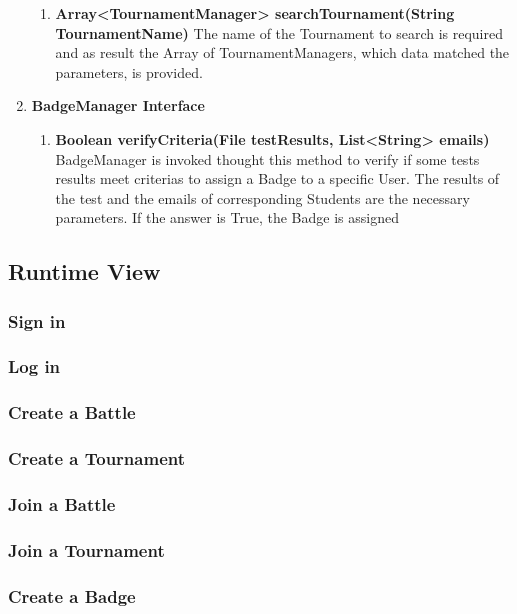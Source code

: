 \begin{enumerate}
\begin{enumerate}[label=$\bullet$]
            \item \textbf{Array<TournamentManager> searchTournament(String TournamentName)} The name of the Tournament to search is required and as result the Array of TournamentManagers, which data matched the parameters, is provided.
        \end{enumerate}
    \item \textbf{BadgeManager Interface}
        \begin{enumerate}[label=$\bullet$]
            \item \textbf{Boolean verifyCriteria(File testResults, List<String> emails)} BadgeManager is invoked thought this method to verify if some tests results meet criterias to assign a Badge to a specific User. The results of the test and the emails of corresponding Students are the necessary parameters. If the answer is True, the Badge is assigned
        \end{enumerate}
\end{enumerate}
\subsection{Runtime View}
\subsubsection{Sign in}
\subsubsection{Log in}
\subsubsection{Create a Battle}
\subsubsection{Create a Tournament}
\subsubsection{Join a Battle}
\subsubsection{Join a Tournament}
\subsubsection{Create a Badge}
